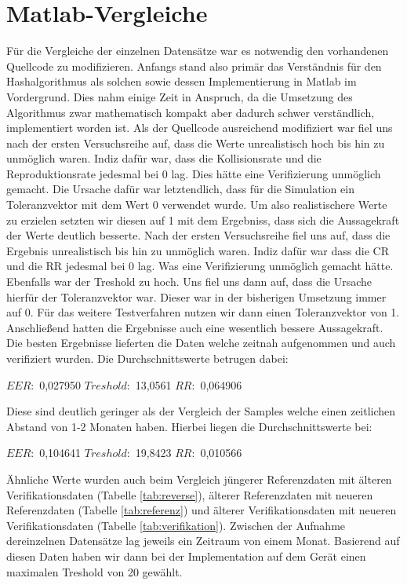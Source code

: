 \section{Matlab-Vergleiche}

F\"ur die Vergleiche der einzelnen Datens\"atze war es notwendig den vorhandenen Quellcode zu modifizieren. Anfangs stand also prim\"ar das Verst\"andnis f\"ur den Hashalgorithmus als solchen sowie dessen Implementierung in Matlab im Vordergrund. Dies nahm einige Zeit in Anspruch, da die Umsetzung des Algorithmus zwar mathematisch kompakt aber dadurch schwer verst\"andlich, implementiert worden ist. Als der Quellcode ausreichend modifiziert war fiel uns nach der ersten Versuchsreihe auf, dass die Werte unrealistisch hoch bis hin zu unm\"oglich waren. Indiz daf\"ur war, dass die Kollisionsrate und die Reproduktionsrate jedesmal bei 0 lag. Dies h\"atte eine Verifizierung unm\"oglich gemacht. Die Ursache daf\"ur war letztendlich, dass f\"ur die Simulation ein Toleranzvektor mit dem Wert 0 verwendet wurde. Um also realistischere Werte zu erzielen setzten wir diesen auf 1 mit dem Ergebniss, dass sich die Aussagekraft der Werte deutlich besserte. Nach der ersten Versuchsreihe fiel uns auf, dass die Ergebnis unrealistisch bis hin zu unm\"oglich waren. Indiz daf\"ur war dass die CR und die RR jedesmal bei 0 lag. Was eine Verifizierung unm\"oglich gemacht h\"atte. Ebenfalls war der Treshold zu hoch. Uns fiel uns dann auf, dass die Ursache hierf\"ur der Toleranzvektor war. Dieser war in der bisherigen Umsetzung immer auf 0. F\"ur das weitere Testverfahren nutzen wir dann einen Toleranzvektor von 1. Anschlie{\ss}end hatten die Ergebnisse auch eine wesentlich bessere Aussagekraft. 
Die besten Ergebnisse lieferten die Daten welche zeitnah aufgenommen und auch verifiziert wurden. Die Durchschnittswerte betrugen dabei:
\newline\newline
\centerline{$EER:$ 0,027950  $Treshold:$ 13,0561  $RR:$ 0,064906}
\newline\newline\noindent
Diese sind deutlich geringer als der Vergleich der Samples welche einen zeitlichen Abstand von 1-2 Monaten haben. Hierbei liegen die Durchschnittswerte bei: 
\newline\newline
\centerline{$EER:$ 0,104641  $Treshold:$ 19,8423  $RR:$ 0,010566}
\newline\newline\noindent
\"Ahnliche Werte wurden auch beim Vergleich j\"ungerer Referenzdaten mit \"alteren Verifikationsdaten (Tabelle \ref{tab:reverse}), \"alterer Referenzdaten mit neueren Referenzdaten (Tabelle \ref{tab:referenz}) und  \"alterer Verifikationsdaten mit neueren Verifikationsdaten (Tabelle \ref{tab:verifikation}). Zwischen der Aufnahme dereinzelnen Datens\"atze lag jeweils ein Zeitraum von einem Monat. Basierend auf diesen Daten haben wir dann bei der Implementation auf dem Ger\"at einen maximalen Treshold von 20 gew\"ahlt.